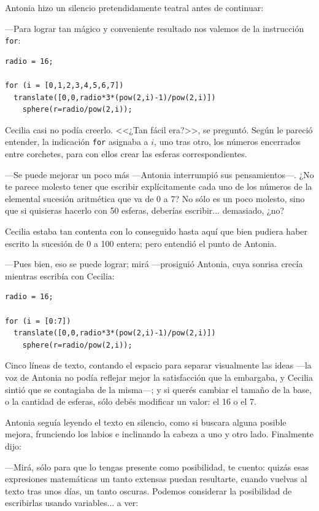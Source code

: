  
 Antonia hizo un silencio pretendidamente teatral antes de continuar:
 
 ---Para lograr tan mágico y conveniente resultado nos valemos de la
 instrucción \lstinline!for!:


    \begin{lstlisting}
radio = 16;      

for (i = [0,1,2,3,4,5,6,7]) 
  translate([0,0,radio*3*(pow(2,i)-1)/pow(2,i)])
    sphere(r=radio/pow(2,i));
    \end{lstlisting}

    Cecilia casi no podía creerlo. <<¿Tan fácil era?>>, se
    preguntó. Según le pareció entender, la indicación \lstinline!for!
    asignaba a $i$, uno tras otro, los números encerrados entre
    corchetes, para con ellos crear las esferas correspondientes.

    ---Se puede mejorar un poco más ---Antonia interrumpió sus
    pen\-sa\-mien\-tos---. ¿No te parece molesto tener que escribir
    explícitamente cada uno de los números de la elemental sucesión
    aritmética que va de 0 a 7? No sólo es un poco molesto, sino que
    si quisieras hacerlo con 50 esferas, deberías
    escribir... demasiado, ¿no?

    Cecilia estaba tan contenta con lo conseguido hasta aquí que bien
    pudiera haber escrito la sucesión de 0 a 100 entera; pero entendió
    el punto de Antonia.

    ---Pues bien, eso se puede lograr; mirá ---prosiguió Antonia, cuya
    sonrisa crecía mientras escribía con Cecilia:


    \begin{lstlisting}
radio = 16;
      
for (i = [0:7]) 
  translate([0,0,radio*3*(pow(2,i)-1)/pow(2,i)])
    sphere(r=radio/pow(2,i));
    \end{lstlisting}

    \guillemotright Cinco líneas de texto, contando el espacio para
    separar visualmente las ideas ---la voz de Antonia no podía
    reflejar mejor la satisfacción que la embargaba, y Cecilia sintió
    que se contagiaba de la misma---; y si querés cambiar el tamaño de
    la base, o la cantidad de esferas, sólo debés modificar un valor:
    el 16 o el 7.

Antonia seguía leyendo el texto en silencio, como si buscara alguna
posible mejora, frunciendo los labios e inclinando la cabeza a uno y
otro lado. Finalmente dijo:

---Mirá, sólo para que lo tengas presente como posibilidad, te cuento:
quizás esas expresiones matemáticas un tanto extensas puedan
resultarte, cuando vuelvas al texto tras unos días, un tanto
oscuras. Podemos considerar la posibilidad de escribirlas usando
variables... a ver:


